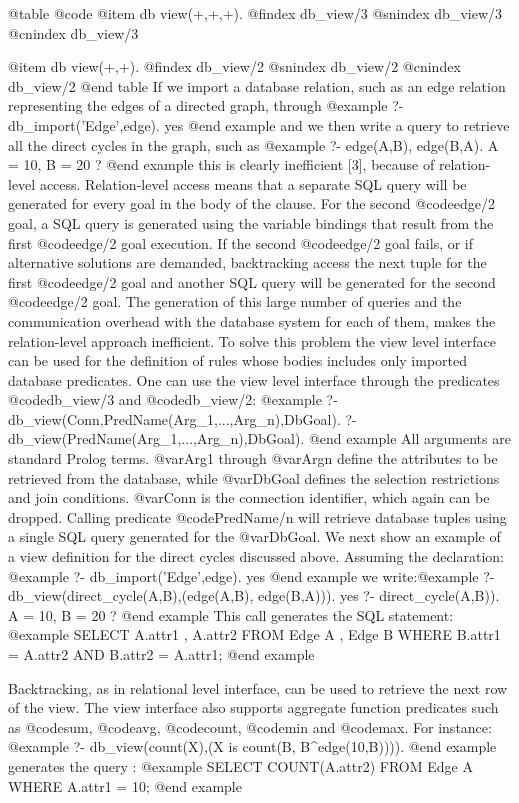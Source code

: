 {{{{{{{{@table @code
@item db view(+,+,+).
@findex db_view/3
@snindex db_view/3
@cnindex db_view/3

@item db view(+,+).
@findex db_view/2
@snindex db_view/2
@cnindex db_view/2
@end table
If we import a database relation, such as an edge relation representing the edges of a directed graph, through
@example
?- db_import('Edge',edge). 
yes
@end example
and we then write a query to retrieve all the direct cycles in the
graph, such as
@example
?- edge(A,B), edge(B,A). 
A = 10, 
B = 20 ?
@end example
this is clearly inefficient [3], because of relation-level
access. Relation-level access means that a separate SQL query will be
generated for every goal in the body of the clause. For the second
@code{edge/2} goal, a SQL query is generated using the variable bindings that
result from the first @code{edge/2} goal execution. If the second
@code{edge/2} goal
fails, or if alternative solutions are demanded, backtracking access the
next tuple for the first @code{edge/2} goal and another SQL query will be
generated for the second @code{edge/2} goal. The generation of this large
number of queries and the communication overhead with the database
system for each of them, makes the relation-level approach inefficient.
To solve this problem the view level interface can be used for the
definition of rules whose bodies includes only imported database
predicates.  One can use the view level interface through the predicates
@code{db_view/3} and @code{db_view/2}:
@example
?- db_view(Conn,PredName(Arg_1,...,Arg_n),DbGoal).  
?- db_view(PredName(Arg_1,...,Arg_n),DbGoal).
@end example
 All arguments are standard Prolog terms. @var{Arg1} through @var{Argn}
define the attributes to be retrieved from the database, while
@var{DbGoal} defines the selection restrictions and join
conditions. @var{Conn} is the connection identifier, which again can be
dropped. Calling predicate @code{PredName/n} will retrieve database
tuples using a single SQL query generated for the @var{DbGoal}.  We next show
an example of a view definition for the direct cycles discussed
above. Assuming the declaration: 
@example
?- db_import('Edge',edge). 
yes
@end example
we
write:@example
?- db_view(direct_cycle(A,B),(edge(A,B), edge(B,A))). 
yes 
?- direct_cycle(A,B)). 
A = 10, 
B = 20 ?  
@end example
This call generates the SQL
statement: @example
SELECT A.attr1 , A.attr2
FROM Edge A , Edge B 
WHERE B.attr1 = A.attr2 AND B.attr2 = A.attr1;
@end example

Backtracking, as in relational level interface, can be used to retrieve the next row of the view.
The view interface also supports aggregate function predicates such as
@code{sum}, @code{avg}, @code{count}, @code{min} and @code{max}. For
instance:
@example
?- db_view(count(X),(X is count(B, B^edge(10,B)))).
@end example
generates the query :
@example
SELECT COUNT(A.attr2) 
FROM Edge A WHERE A.attr1 = 10;
@end example

}}}}}}}}
